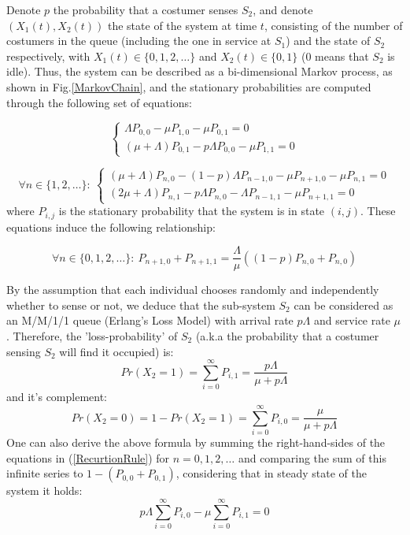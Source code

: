 \documentclass[11pt]{article}
\numberwithin{equation}{section}
\begin{document}
Denote $p$ the probability that a costumer senses $S_{2}$, and denote $(X_{1}(t), X_{2}(t))$ the state of the system at time $t$, consisting of the number of costumers in the queue (including the one in service at $S_{1}$) and the state of $S_{2}$ respectively, with $X_{1}(t) \in \lbrace0, 1, 2, \ldots\rbrace$ and $X_{2}(t) \in \lbrace0, 1\rbrace$ (0 means that $S_{2}$ is idle). Thus, the system can be described as a bi-dimensional Markov process, as shown in Fig.\ref{MarkovChain}, and the stationary probabilities are computed through the following set of equations: 

\begin{equation}
  \begin{cases}
    \Lambda P_{0,0} - \mu P_{1,0}  - \mu P_{0,1} = 0\\
    (\mu+\Lambda) P_{0,1} - p\Lambda P_{0,0}  - \mu P_{1,1} = 0
  \end{cases}
	\label{StateEq1}
\end{equation}

\begin{equation}
  \forall n \in \lbrace 1, 2, \ldots \rbrace: \ \begin{cases}
    (\mu+\Lambda) P_{n,0} - (1-p) \Lambda P_{n-1, 0} - \mu P_{n+1,0}  - \mu P_{n,1} = 0\\
    (2\mu+\Lambda) P_{n,1} - p\Lambda P_{n,0}  - \Lambda P_{n-1,1} - \mu P_{n+1,1} = 0
  \end{cases} \label{StateEq2}
\end{equation}
where $P_{i,j}$ is the stationary probability that the system is in state $(i,j)$. These equations induce the following relationship:

\begin{equation}
  \forall n \in \lbrace 0, 1, 2, \ldots \rbrace: \ 
    P_{n+1,0} + P_{n+1,1} = \dfrac{\Lambda}{\mu}((1-p) P_{n,0} +  P_{n, 0}) \label{RecurtionRule}
\end{equation}

By the assumption that each individual chooses randomly and independently whether to sense or not, we deduce that the sub-system $S_{2}$ can be considered as an M/M/1/1 queue (Erlang's Loss Model) with arrival rate $p\Lambda$ and service rate $\mu$. Therefore, the 'loss-probability' of $S_{2}$ (a.k.a the probability that a costumer sensing $S_{2}$ will find it occupied) is:
\begin{equation}
	Pr(X_2=1) = \sum\limits_{i=0}^{\infty} P_{i, 1} = \dfrac{p\Lambda}{\mu+p\Lambda} \label{LossProb}
\end{equation}
and it's complement:
\begin{equation}
	Pr(X_2=0) = 1-Pr(X_2=1) = \sum\limits_{i=0}^{\infty} P_{i, 0} = \dfrac{\mu}{\mu+p\Lambda} \label{OMLossProb}
\end{equation}
One can also derive the above formula by summing the right-hand-sides of the equations in (\ref{RecurtionRule}) for $n=0,1,2,\ldots$ and comparing the sum of this infinite series to $1-(P_{0,0}+P_{0,1})$, considering that in steady state of the system it holds: \[ p\Lambda\sum_{i=0}^{\infty}P_{i,0} - \mu \sum_{i=0}^{\infty}P_{i,1} = 0\]
\end{document}
